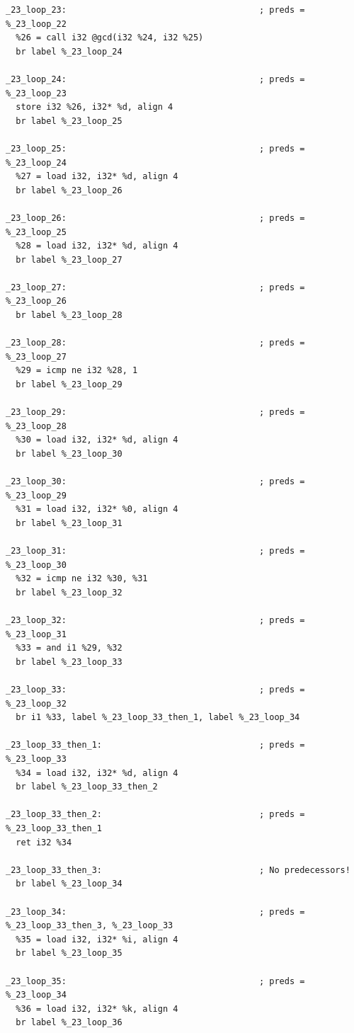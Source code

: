 \documentclass[12pt,a4paper]{article}
\begin{document}
\begin{verbatim}
_23_loop_23:                                      ; preds = %_23_loop_22
  %26 = call i32 @gcd(i32 %24, i32 %25)
  br label %_23_loop_24

_23_loop_24:                                      ; preds = %_23_loop_23
  store i32 %26, i32* %d, align 4
  br label %_23_loop_25

_23_loop_25:                                      ; preds = %_23_loop_24
  %27 = load i32, i32* %d, align 4
  br label %_23_loop_26

_23_loop_26:                                      ; preds = %_23_loop_25
  %28 = load i32, i32* %d, align 4
  br label %_23_loop_27

_23_loop_27:                                      ; preds = %_23_loop_26
  br label %_23_loop_28

_23_loop_28:                                      ; preds = %_23_loop_27
  %29 = icmp ne i32 %28, 1
  br label %_23_loop_29

_23_loop_29:                                      ; preds = %_23_loop_28
  %30 = load i32, i32* %d, align 4
  br label %_23_loop_30

_23_loop_30:                                      ; preds = %_23_loop_29
  %31 = load i32, i32* %0, align 4
  br label %_23_loop_31

_23_loop_31:                                      ; preds = %_23_loop_30
  %32 = icmp ne i32 %30, %31
  br label %_23_loop_32

_23_loop_32:                                      ; preds = %_23_loop_31
  %33 = and i1 %29, %32
  br label %_23_loop_33

_23_loop_33:                                      ; preds = %_23_loop_32
  br i1 %33, label %_23_loop_33_then_1, label %_23_loop_34

_23_loop_33_then_1:                               ; preds = %_23_loop_33
  %34 = load i32, i32* %d, align 4
  br label %_23_loop_33_then_2

_23_loop_33_then_2:                               ; preds = %_23_loop_33_then_1
  ret i32 %34

_23_loop_33_then_3:                               ; No predecessors!
  br label %_23_loop_34

_23_loop_34:                                      ; preds = %_23_loop_33_then_3, %_23_loop_33
  %35 = load i32, i32* %i, align 4
  br label %_23_loop_35

_23_loop_35:                                      ; preds = %_23_loop_34
  %36 = load i32, i32* %k, align 4
  br label %_23_loop_36


\end{verbatim}
\end{document}

